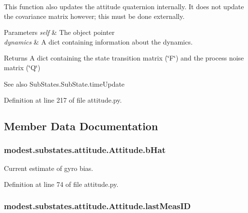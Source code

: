 This function also updates the attitude quaternion internally. It does not update the covariance matrix however; this must be done externally.


\begin{DoxyParams}{Parameters}
{\em self} & The object pointer \\
\hline
{\em dynamics} & A dict containing information about the dynamics.\\
\hline
\end{DoxyParams}
\begin{DoxyReturn}{Returns}
A dict containing the state transition matrix (\char`\"{}\+F\char`\"{}) and the process noise matrix (\char`\"{}\+Q\char`\"{})
\end{DoxyReturn}
\begin{DoxySeeAlso}{See also}
Sub\+States.\+Sub\+State.\+time\+Update 
\end{DoxySeeAlso}


Definition at line 217 of file attitude.\+py.



\subsection{Member Data Documentation}
\subsubsection[{\texorpdfstring{b\+Hat}{bHat}}]{\setlength{\rightskip}{0pt plus 5cm}modest.\+substates.\+attitude.\+Attitude.\+b\+Hat}\hypertarget{classmodest_1_1substates_1_1attitude_1_1Attitude_aac0bc92dc53893d2f190c1252690053c}{}\label{classmodest_1_1substates_1_1attitude_1_1Attitude_aac0bc92dc53893d2f190c1252690053c}


Current estimate of gyro bias. 



Definition at line 74 of file attitude.\+py.

\subsubsection[{\texorpdfstring{last\+Meas\+ID}{lastMeasID}}]{\setlength{\rightskip}{0pt plus 5cm}modest.\+substates.\+attitude.\+Attitude.\+last\+Meas\+ID}\hypertarget{classmodest_1_1substates_1_1attitude_1_1Attitude_abc1a273c6fd65c839184ae644b68f010}{}\label{classmodest_1_1substates_1_1attitude_1_1Attitude_abc1a273c6fd65c839184ae644b68f010}



